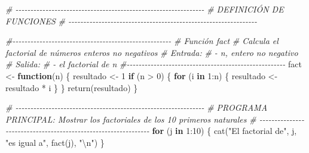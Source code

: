 \documentclass[
]{book}
\newenvironment{Shaded}{\begin{snugshade}}{\end{snugshade}}
\newcommand{\CommentTok}[1]{\textcolor[rgb]{0.56,0.35,0.01}{\textit{#1}}}
\newcommand{\ControlFlowTok}[1]{\textcolor[rgb]{0.13,0.29,0.53}{\textbf{#1}}}
\newcommand{\DecValTok}[1]{\textcolor[rgb]{0.00,0.00,0.81}{#1}}
\newcommand{\FunctionTok}[1]{\textcolor[rgb]{0.00,0.00,0.00}{#1}}
\newcommand{\NormalTok}[1]{#1}
\newcommand{\OtherTok}[1]{\textcolor[rgb]{0.56,0.35,0.01}{#1}}
\newcommand{\SpecialCharTok}[1]{\textcolor[rgb]{0.00,0.00,0.00}{#1}}
\newcommand{\StringTok}[1]{\textcolor[rgb]{0.31,0.60,0.02}{#1}}
\begin{document}
\begin{Shaded}
\begin{Highlighting}[]
\CommentTok{\# {-}{-}{-}{-}{-}{-}{-}{-}{-}{-}{-}{-}{-}{-}{-}{-}{-}{-}{-}{-}{-}{-}{-}{-}{-}{-}{-}{-}{-}{-}{-}{-}{-}{-}{-}{-}{-}{-}{-}{-}{-}{-}{-}{-}{-}{-}{-}{-}{-}{-}{-}{-}{-}{-}{-}{-}{-}{-}{-}{-}{-}{-}{-}}
\CommentTok{\# DEFINICIÓN DE FUNCIONES}
\CommentTok{\# {-}{-}{-}{-}{-}{-}{-}{-}{-}{-}{-}{-}{-}{-}{-}{-}{-}{-}{-}{-}{-}{-}{-}{-}{-}{-}{-}{-}{-}{-}{-}{-}{-}{-}{-}{-}{-}{-}{-}{-}{-}{-}{-}{-}{-}{-}{-}{-}{-}{-}{-}{-}{-}{-}{-}{-}{-}{-}{-}{-}{-}{-}{-}}

\CommentTok{\#{-}{-}{-}{-}{-}{-}{-}{-}{-}{-}{-}{-}{-}{-}{-}{-}{-}{-}{-}{-}{-}{-}{-}{-}{-}{-}{-}{-}{-}{-}{-}{-}{-}{-}{-}{-}{-}{-}{-}{-}{-}{-}{-}{-}{-}{-}{-}{-}{-}{-}{-}{-}{-}}
\CommentTok{\# Función fact}
\CommentTok{\# Calcula el factorial de números enteros no negativos}
\CommentTok{\# Entrada:}
\CommentTok{\#       {-} n, entero no negativo}
\CommentTok{\# Salida:}
\CommentTok{\#       {-} el factorial de n}
\CommentTok{\#{-}{-}{-}{-}{-}{-}{-}{-}{-}{-}{-}{-}{-}{-}{-}{-}{-}{-}{-}{-}{-}{-}{-}{-}{-}{-}{-}{-}{-}{-}{-}{-}{-}{-}{-}{-}{-}{-}{-}{-}{-}{-}{-}{-}{-}{-}{-}{-}{-}{-}{-}{-}{-}}
\NormalTok{fact }\OtherTok{\textless{}{-}} \ControlFlowTok{function}\NormalTok{(n) \{}
\NormalTok{    resultado }\OtherTok{\textless{}{-}} \DecValTok{1}
    \ControlFlowTok{if}\NormalTok{ (n }\SpecialCharTok{\textgreater{}} \DecValTok{0}\NormalTok{) \{}
        \ControlFlowTok{for}\NormalTok{ (i }\ControlFlowTok{in} \DecValTok{1}\SpecialCharTok{:}\NormalTok{n) \{}
\NormalTok{            resultado }\OtherTok{\textless{}{-}}\NormalTok{ resultado }\SpecialCharTok{*}\NormalTok{ i}
\NormalTok{        \}}
\NormalTok{    \}}
    \FunctionTok{return}\NormalTok{(resultado)}
\NormalTok{\}}

\CommentTok{\# {-}{-}{-}{-}{-}{-}{-}{-}{-}{-}{-}{-}{-}{-}{-}{-}{-}{-}{-}{-}{-}{-}{-}{-}{-}{-}{-}{-}{-}{-}{-}{-}{-}{-}{-}{-}{-}{-}{-}{-}{-}{-}{-}{-}{-}{-}{-}{-}{-}{-}{-}{-}{-}{-}{-}{-}{-}{-}{-}{-}{-}{-}{-}}
\CommentTok{\# PROGRAMA PRINCIPAL: Mostrar los factoriales de los 10 primeros naturales}
\CommentTok{\# {-}{-}{-}{-}{-}{-}{-}{-}{-}{-}{-}{-}{-}{-}{-}{-}{-}{-}{-}{-}{-}{-}{-}{-}{-}{-}{-}{-}{-}{-}{-}{-}{-}{-}{-}{-}{-}{-}{-}{-}{-}{-}{-}{-}{-}{-}{-}{-}{-}{-}{-}{-}{-}{-}{-}{-}{-}{-}{-}{-}{-}{-}{-}}
\ControlFlowTok{for}\NormalTok{ (j }\ControlFlowTok{in} \DecValTok{1}\SpecialCharTok{:}\DecValTok{10}\NormalTok{) \{}
    \FunctionTok{cat}\NormalTok{(}\StringTok{"El factorial de"}\NormalTok{, j, }\StringTok{"es igual a"}\NormalTok{, }\FunctionTok{fact}\NormalTok{(j), }\StringTok{"}\SpecialCharTok{\textbackslash{}n}\StringTok{"}\NormalTok{)}
\NormalTok{\}}
\end{Highlighting}
\end{Shaded}
\end{document}

